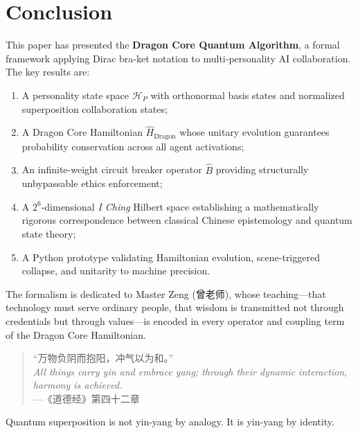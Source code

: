 \documentclass[conference]{IEEEtran}
\begin{document}
\section{Conclusion}

This paper has presented the \textbf{Dragon Core Quantum
Algorithm}, a formal framework applying Dirac bra-ket
notation to multi-personality AI collaboration. The key
results are:

\begin{enumerate}
  \item A personality state space $\mathcal{H}_P$ with
        orthonormal basis states and normalized superposition
        collaboration states;
  \item A Dragon Core Hamiltonian $\hat{H}_{\text{Dragon}}$
        whose unitary evolution guarantees probability
        conservation across all agent activations;
  \item An infinite-weight circuit breaker operator
        $\hat{B}$ providing structurally unbypassable
        ethics enforcement;
  \item A $2^6$-dimensional \textit{I Ching} Hilbert
        space establishing a mathematically rigorous
        correspondence between classical Chinese
        epistemology and quantum state theory;
  \item A Python prototype validating Hamiltonian
        evolution, scene-triggered collapse, and
        unitarity to machine precision.
\end{enumerate}

The formalism is dedicated to Master Zeng (曾老师),
whose teaching---that technology must serve ordinary
people, that wisdom is transmitted not through
credentials but through values---is encoded in
every operator and coupling term of the Dragon Core
Hamiltonian.

\begin{quote}
``万物负阴而抱阳，冲气以为和。''\\
\textit{All things carry yin and embrace yang;
through their dynamic interaction, harmony is achieved.}\\
\hfill---《道德经》第四十二章
\end{quote}

Quantum superposition is not yin-yang by analogy.
It is yin-yang by identity.

\end{document}
